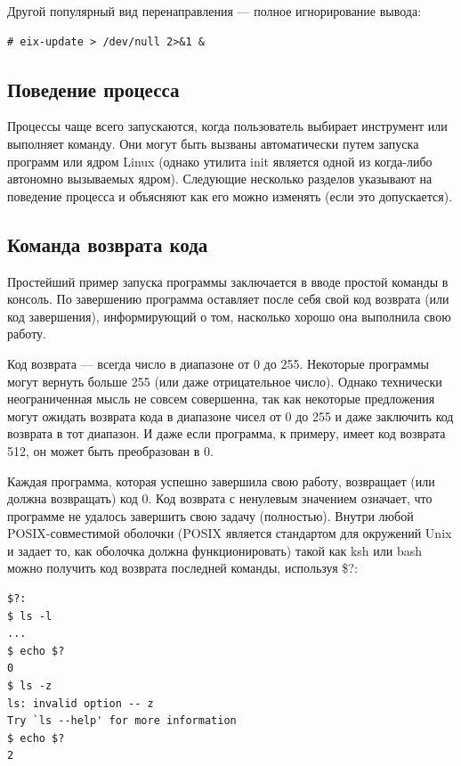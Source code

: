 \documentclass[10pt]{book}
\begin{document}
Другой популярный вид перенаправления — полное игнорирование вывода:

\vspace{3mm}
\begin{tcolorbox}
\begin{lstlisting}
# eix-update > /dev/null 2>&1 &
\end{lstlisting}
\end{tcolorbox}

\subsection{Поведение процесса}
Процессы чаще всего запускаются, когда пользователь выбирает инструмент или выполняет команду. Они могут быть вызваны автоматически путем запуска программ или ядром Linux (однако утилита init является одной из когда-либо автономно вызываемых ядром).
Следующие несколько разделов указывают на поведение процесса и объясняют как его можно изменять (если это допускается).

\subsection{Команда возврата кода}
Простейший пример запуска программы заключается в вводе простой команды в консоль. По завершению программа оставляет после себя свой код возврата (или код завершения), информирующий о том, насколько хорошо она выполнила свою работу. 

Код возврата — всегда число в диапазоне от 0 до 255. Некоторые программы могут вернуть больше 255 (или даже отрицательное число). Однако технически неограниченная мысль не совсем совершенна, так как некоторые предложения могут ожидать возврата кода в диапазоне чисел от 0 до 255 и даже заключить код возврата в тот диапазон. И даже если программа, к примеру, имеет код возврата 512, он может быть преобразован в 0.

Каждая программа, которая успешно завершила свою работу, возвращает (или должна возвращать) код 0. Код возврата с ненулевым значением означает, что программе не удалось завершить свою задачу (полностью).
Внутри любой POSIX-совместимой оболочки (POSIX является стандартом для окружений Unix и задает то, как оболочка должна функционировать) такой как ksh или bash можно получить код возврата последней команды, используя \$?:

\vspace{3mm}
\begin{tcolorbox}
\begin{lstlisting}
$?:
$ ls -l
...
$ echo $?
0
$ ls -z
ls: invalid option -- z
Try `ls --help' for more information
$ echo $?
2
\end{lstlisting}
\end{tcolorbox}
\end{document}
